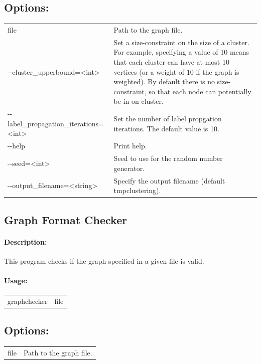 \documentclass[11pt]{article}
\begin{document}
\subsection*{Options:\\} 
\begin{tabularx}{\textwidth}{lX}
  file                       & Path to the graph file. \\
  -{}-cluster\_upperbound=<int>             &  Set a size-constraint on the size of a cluster. For example, specifying a value of 10 means that each cluster can have at most 10 vertices (or a weight of 10 if the graph is weighted). By default there is no size-constraint, so that each node can potentially be in on cluster.  \\
  -{}-label\_propagation\_iterations=<int>  &   Set the number of label propgation iterations. The default value is 10. \\

  -{}-help                     & Print help. \\
  -{}-seed=<int>               & Seed to use for the random number generator. \\
  -{}-output\_filename=<string>               & Specify the output filename (default tmpclustering). \\
\end{tabularx}

\subsection{Graph Format Checker}
\paragraph*{Description:} This program checks if the graph specified in a given file is valid. 
\paragraph*{Usage:\\} 
\begin{tabular}{ll}
graphchecker & file
\end{tabular}
\subsection*{Options:\\} 
\begin{tabularx}{\textwidth}{lX}
  file                       & Path to the graph file. \\
\end{tabularx}

\vfill
\pagebreak
\vfill
\pagebreak


\end{document}
